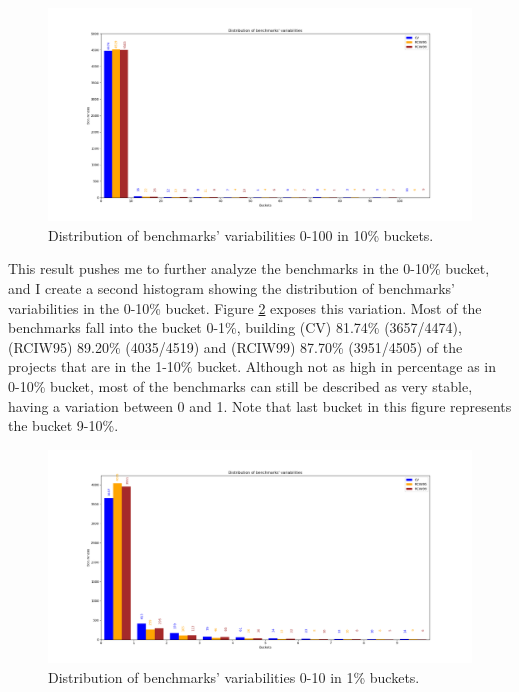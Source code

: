 \documentclass{seal_thesis}
\begin{document}
\begin{figure}[H]
	\centering
	\includegraphics[width=\linewidth]{benchmarks0-100}
	\caption{Distribution of benchmarks' variabilities 0-100 in 10\% buckets.}
	\label{fig:benchmark0-100}
\end{figure}

\noindent This result pushes me to further analyze the benchmarks in the 0-10\% bucket, and I create a second histogram showing the distribution of benchmarks' variabilities in the 0-10\% bucket. Figure \ref{fig:benchmark0-10} exposes this variation. Most of the benchmarks fall into the bucket 0-1\%, building (CV) 81.74\% (3657/4474), (RCIW95) 89.20\% (4035/4519) and (RCIW99) 87.70\% (3951/4505) of the projects that are in the 1-10\% bucket. Although not as high in percentage as in 0-10\% bucket, most of the benchmarks can still be described as very stable, having a variation between 0 and 1. Note that last bucket in this figure represents the bucket 9-10\%.

\begin{figure}[H]
	\centering
	\includegraphics[width=\linewidth]{benchmarks0-10}
	\caption{Distribution of benchmarks' variabilities 0-10 in 1\% buckets.}
	\label{fig:benchmark0-10}
\end{figure}
\end{document}
